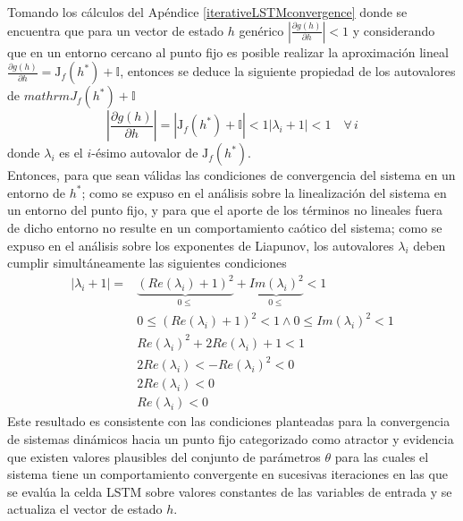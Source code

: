 \documentclass{article}
\begin{document}
	Tomando los cálculos del Apéndice \ref{iterativeLSTMconvergence} donde se encuentra que para un vector de estado $h$ genérico $\left\lvert \frac{\partial g(h)}{\partial h} \right\rvert < 1$ y considerando que en un entorno cercano al punto fijo es posible realizar la aproximación lineal $\frac{\partial g(h)}{\partial h} = \mathrm{J}_f(h^*) + \mathbb{I}$, entonces se deduce la siguiente propiedad de los autovalores de $mathrm{J}_f(h^*) + \mathbb{I}$
	\begin{equation*}
	\left\lvert \dfrac{\partial g(h)}{\partial h} \right\rvert = | \mathrm{J}_f(h^*) + \mathbb{I} | < 1
	|\lambda_i + 1| < 1 \quad \forall \, i
	\end{equation*}
	donde $\lambda_i$ es el $i$-ésimo autovalor de $\mathrm{J}_f(h^*)$. \\
	Entonces, para que sean válidas las condiciones de convergencia del sistema en un entorno de $h^*$; como se expuso en el análisis sobre la linealización del sistema en un entorno del punto fijo, y para que el aporte de los términos no lineales fuera de dicho entorno no resulte en un comportamiento caótico del sistema; como se expuso en el análisis sobre los exponentes de Liapunov, los autovalores $\lambda_i$ deben cumplir simultáneamente las siguientes condiciones
	\begin{equation*}
	\begin{split}
	|\lambda_i + 1| = &\underbrace{(Re(\lambda_i) + 1)^2}_{0 \le} + \underbrace{Im(\lambda_i)^2}_{0 \le} < 1\\
	&0 \le (Re(\lambda_i) + 1)^2 < 1 \land 0 \le Im(\lambda_i)^2 < 1\\
	& Re(\lambda_i)^2 + 2Re(\lambda_i) + 1  < 1\\
	& 2Re(\lambda_i) < - Re(\lambda_i)^2 < 0\\
	& 2Re(\lambda_i) < 0\\
	& Re(\lambda_i) < 0
	\end{split}
	\end{equation*}
	Este resultado es consistente con las condiciones planteadas para la convergencia de sistemas dinámicos hacia un punto fijo categorizado como atractor y evidencia que existen valores plausibles del conjunto de parámetros $\theta$ para las cuales el sistema tiene un comportamiento convergente en sucesivas iteraciones en las que se evalúa la celda LSTM sobre valores constantes de las variables de entrada y se actualiza el vector de estado $h$.
	
\end{document}
